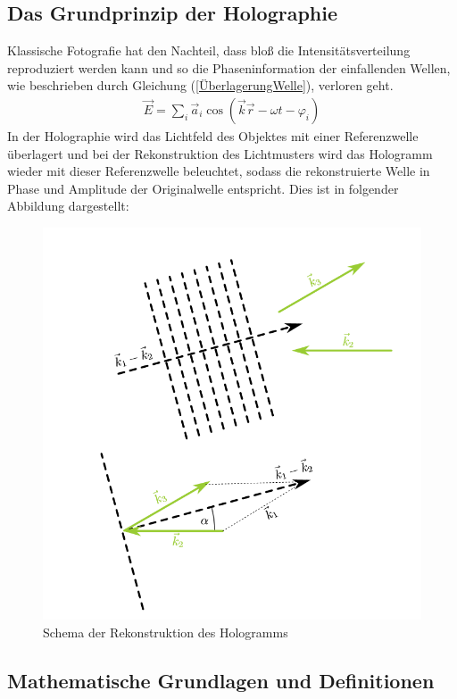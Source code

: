 \documentclass[german,  %
parskip=full,  %
]{scrartcl}
\begin{document}
\subsection{Das Grundprinzip der Holographie}
Klassische Fotografie hat den Nachteil, dass bloß die Intensitätsverteilung reproduziert werden kann und so die Phaseninformation der einfallenden Wellen, wie beschrieben durch Gleichung (\ref{ÜberlagerungWelle}), verloren geht.
\begin{align}
\label{ÜberlagerungWelle} \vec{E}=\sum_{i}\vec{a}_i \cos(\vec{k} \vec{r} - \omega t - \varphi_i)
\end{align}
In der Holographie wird das Lichtfeld des Objektes mit einer Referenzwelle überlagert und bei der Rekonstruktion des Lichtmusters wird das Hologramm wieder mit dieser Referenzwelle beleuchtet, sodass die rekonstruierte Welle in Phase und Amplitude der Originalwelle entspricht. Dies ist in folgender Abbildung dargestellt:
\begin{figure}[h!]\centering
\includegraphics[scale=0.3]{rekonstruktion.png}
\caption{Schema der Rekonstruktion des Hologramms}
\end{figure}
\newpage
\subsection{Mathematische Grundlagen und Definitionen}
\end{document}

